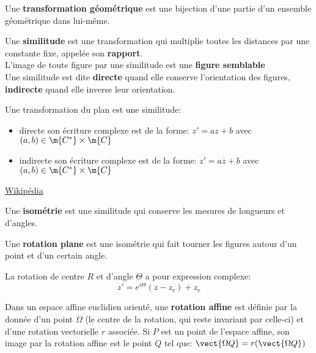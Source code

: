 \def\theme{Transformations du plan. Frises et pavages.}
\def\date{24/10/2023}


Une \textbf{transformation géométrique} est 
une bijection d'une partie d'un ensemble géométrique dans lui-même.

Une \textbf{similitude} est une transformation 
qui multiplie toutes les distances par une constante fixe, appelée son \textbf{rapport}.\\
L'image de toute figure par une similitude est une \textbf{figure semblable}\\
Une similitude est dite \textbf{directe} quand elle conserve l’orientation des figures,
\textbf{indirecte} quand elle inverse leur orientation.

\thm{}
Une transformation du plan est une similitude:
\begin{itemize}
    \item directe 
    \ssi{} son écriture complexe est de la forme:
    $z'=az+b$ avec $(a,b)\in\m{C^*}\times\m{C}$
    \item indirecte
    \ssi{} son écriture complexe est de la forme:
    $z'=a\overline{z}+b$ avec $(a,b)\in\m{C^*}\times\m{C}$
\end{itemize}

\demo{}\href{https://www.wikiwand.com/fr/Similitude_(g%C3%A9om%C3%A9trie)#Expression_complexe}{Wikipédia}

Une \textbf{isométrie} est une similitude qui conserve les mesures de longueurs et d'angles.

Une \textbf{rotation plane} est une isométrie
qui fait tourner les figures autour d'un point et d'un certain angle.

La rotation de centre $R$ et d'angle $\Theta$ a pour expression complexe:
\begin{equation*}
    z'=e^{i\Theta}(z-z_r)+z_r
\end{equation*}

Dans un espace affine euclidien orienté, une \textbf{rotation affine} est définie par la donnée d'un point $\Omega$
(le centre de la rotation, qui reste invariant par celle-ci) et d'une rotation vectorielle $r$ associée.
Si $P$ est un point de l'espace affine, son image par la rotation affine est le point $Q$ tel que:
$\vect{\Omega Q} = r(\vect{\Omega Q})$

